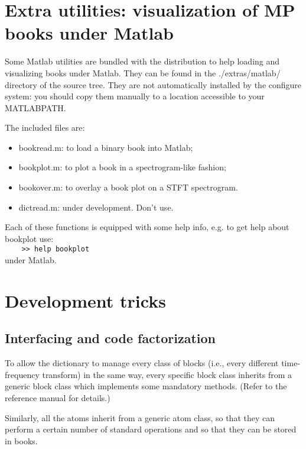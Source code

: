 \documentclass[11pt,a4paper]{article}
\begin{document}
\clearpage
\section{Extra utilities: visualization of MP books under Matlab \label{matlab}}

Some Matlab utilities are bundled with the distribution to help loading and
visualizing books under Matlab. They can be found in the ./extras/matlab/
directory of the source tree. They are not automatically installed by the
configure system: you should copy them manually to a location accessible to
your MATLABPATH.

\bigskip

\noindent The included files are:
\begin{itemize}
\item bookread.m: to load a binary book into Matlab;
\item bookplot.m: to plot a book in a spectrogram-like fashion;
\item bookover.m: to overlay a book plot on a STFT spectrogram.
\item dictread.m: under development. Don't use.
\end{itemize}
Each of these functions is equipped with some help info, e.g. to get help about
bookplot use:\\
\verb+    >> help bookplot+ \\
under Matlab.


\appendix

\clearpage
\section{Development tricks}

\subsection{Interfacing and code factorization}
To allow the dictionary to manage every class of blocks (i.e., every different
time-frequency transform) in the same way, every specific block class
inherits from a generic block class which implements some mandatory methods.
(Refer to the reference manual for details.)

Similarly, all the atoms inherit from a generic atom class, so that they can
perform a certain number of standard operations and so that they can be stored
in books.


\end{document}
